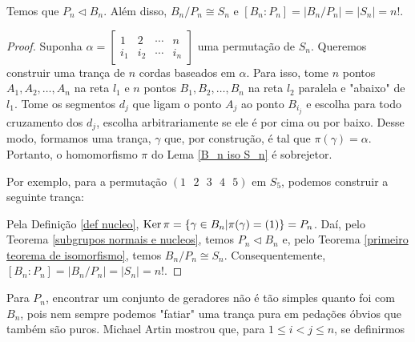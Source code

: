 	\begin{prop}
		\label{P_n normal em B_n}
		Temos que $P_n\vartriangleleft B_n$. Além disso, $B_n/P_n \cong S_n$ e $[B_n:P_n] = |B_n/P_n| = |S_n| = n!$.
	\end{prop}
	
	\begin{proof}
		Suponha $\alpha = \begin{bmatrix}
		1 & 2 & \cdots & n \\
		i_1 & i_2 & \cdots & i_n
		\end{bmatrix}$ uma permutação de $S_n$. Queremos construir uma trança de $n$ cordas baseados em $\alpha$. Para isso, tome $n$ pontos $A_1, A_2, \dots, A_n$ na reta $l_1$ e $n$ pontos $B_1, B_2, \dots, B_n$ na reta $l_2$ paralela e "abaixo" de $l_1$. Tome os segmentos $d_j$ que ligam o ponto $A_j$ ao ponto $B_{i_j}$ e escolha para todo cruzamento dos $d_j$, escolha arbitrariamente se ele é por cima ou por baixo. Desse modo, formamos uma trança, $\gamma$ que, por construção, é tal que $\pi(\gamma) = \alpha$. Portanto, o homomorfismo $\pi$ do Lema \eqref{B_n iso S_n} é sobrejetor. 
		
		\par\vspace{0.3cm} Por exemplo, para a permutação $(1\text{ }2\text{ }3\text{ }4\text{ }5)$ em $S_5$, podemos construir a seguinte trança:
		\begin{center}
		\end{center}
		
		\par\vspace{0.3cm} Pela Definição \eqref{def nucleo}, $\operatorname{Ker}\pi = \left\{ \gamma\in B_n | \pi(\gamma) = (1) \right\} = P_n$. Daí, pelo Teorema \eqref{subgrupos normais e nucleos}, temos $P_n\triangleleft B_n$ e, pelo Teorema \eqref{primeiro teorema de isomorfismo}, temos $B_n/P_n\cong S_n$. Consequentemente, $[B_n:P_n] = |B_n/P_n| = |S_n| = n!$. 
		
	\end{proof}
	
	\par\vspace{0.3cm} Para $P_n$, encontrar um conjunto de geradores não é tão simples quanto foi com $B_n$, pois nem sempre podemos "fatiar" uma trança pura em pedações óbvios que também são puros. Michael Artin mostrou que, para $1\leq i<j\leq n$, se definirmos
	
